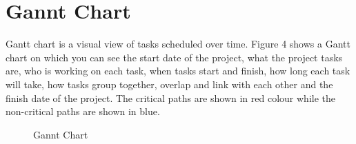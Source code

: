\chapter*{Gannt Chart}
\noindent  Gantt chart is a visual view of tasks scheduled over time. Figure 4 shows a Gantt chart on which you can see the start date of the project, what the project tasks are, who is working on each task, when tasks start and finish, how long each task will take, how tasks group together, overlap and link with each other and the finish date of the project. The critical paths are shown in red colour while the non-critical paths are shown in blue.

\begin{figure}[h]
\centering
{}
\newline
{}
\caption{Gannt Chart }
\end{figure}
